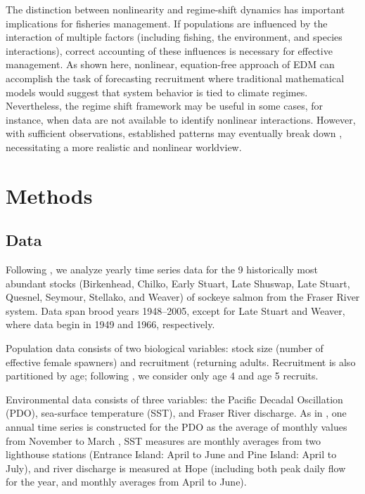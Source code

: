 The distinction between nonlinearity and regime-shift dynamics has important implications for fisheries management. If populations are influenced by the interaction of multiple factors (including fishing, the environment, and species interactions), correct accounting of these influences is necessary for effective management. As shown here, nonlinear, equation-free approach of EDM can accomplish the task of forecasting recruitment where traditional mathematical models would suggest that system behavior is tied to climate regimes. Nevertheless, the regime shift framework may be useful in some cases, for instance, when data are not available to identify nonlinear interactions. However, with sufficient observations, established patterns may eventually break down \cite{Litzow_2014a}, necessitating a more realistic and nonlinear worldview.

\section{Methods}

\subsection{Data}

Following \cite{Ye_2015}, we analyze yearly time series data for the 9 historically most abundant stocks (Birkenhead, Chilko, Early Stuart, Late Shuswap, Late Stuart, Quesnel, Seymour, Stellako, and Weaver) of sockeye salmon from the Fraser River system. Data span brood years 1948--2005, except for Late Stuart and Weaver, where data begin in 1949 and 1966, respectively.

Population data consists of two biological variables: stock size (number of effective female spawners) and recruitment (returning adults. Recruitment is also partitioned by age; following \cite{Grant_2010}, we consider only age 4 and age 5 recruits.

Environmental data consists of three variables: the Pacific Decadal Oscillation (PDO), sea-surface temperature (SST), and Fraser River discharge. As in \cite{Ye_2015}, one annual time series is constructed for the PDO as the average of monthly values from November to March \cite{Mantua_1997}, SST measures are monthly averages from two lighthouse stations (Entrance Island: April to June and Pine Island: April to July), and river discharge is measured at Hope (including both peak daily flow for the year, and monthly averages from April to June).

